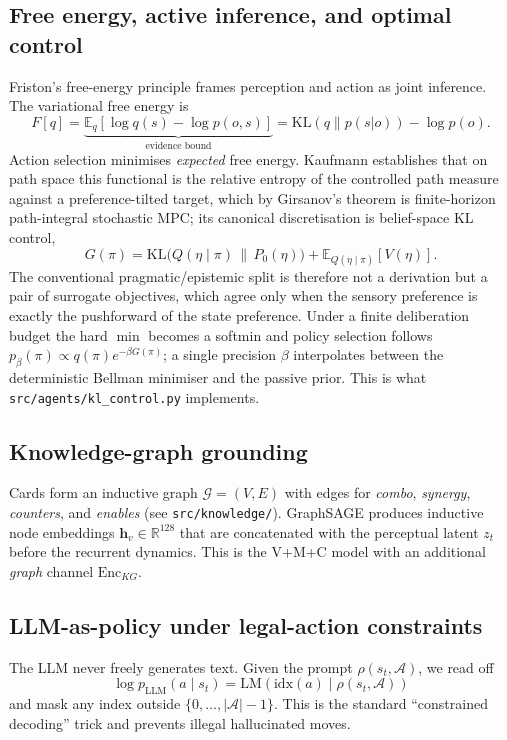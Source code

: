 \documentclass[11pt,a4paper]{article}
\begin{document}
\subsection{Free energy, active inference, and optimal control}
Friston's free-energy principle frames perception and action as joint
inference.  The variational free energy is
%
\begin{equation}
F[q] = \underbrace{\mathbb{E}_q[\log q(s) - \log p(o,s)]}_{\text{evidence bound}}
     = \mathrm{KL}(q\|p(s|o)) - \log p(o).
\end{equation}
%
Action selection minimises \emph{expected} free energy. Kaufmann
\cite{kaufmann2026aifcontrol} establishes that on path space this
functional is the relative entropy of the controlled path measure against
a preference-tilted target, which by Girsanov's theorem is finite-horizon
path-integral stochastic MPC; its canonical discretisation is
belief-space KL control,
%
\begin{equation}
G(\pi) = \mathrm{KL}\!\big(Q(\eta\mid\pi)\,\|\,P_0(\eta)\big)
       + \mathbb{E}_{Q(\eta\mid\pi)}[V(\eta)].
\end{equation}
%
The conventional pragmatic/epistemic split is therefore not a derivation
but a pair of surrogate objectives, which agree only when the sensory
preference is exactly the pushforward of the state preference.  Under a
finite deliberation budget the hard $\min$ becomes a softmin and policy
selection follows $p_\beta(\pi) \propto q(\pi)e^{-\beta G(\pi)}$; a single
precision $\beta$ interpolates between the deterministic Bellman minimiser
and the passive prior.  This is what
\texttt{src/agents/kl\_control.py} implements.

\subsection{Knowledge-graph grounding}
Cards form an inductive graph $\mathcal{G}=(V,E)$ with edges for
\emph{combo}, \emph{synergy}, \emph{counters}, and \emph{enables}
(see \texttt{src/knowledge/}).  GraphSAGE produces inductive node
embeddings $\mathbf{h}_v \in \mathbb{R}^{128}$ that are concatenated
with the perceptual latent $z_t$ before the recurrent dynamics.  This
is the V+M+C model with an additional \emph{graph} channel
$\mathrm{Enc}_{KG}$.

\subsection{LLM-as-policy under legal-action constraints}
The LLM never freely generates text.  Given the prompt
$\rho(s_t,\mathcal{A})$, we read off
%
\begin{equation}
\log p_{\text{LLM}}(a\mid s_t) =
  \mathrm{LM}(\text{idx}(a) \mid \rho(s_t,\mathcal{A}))
\end{equation}
%
and mask any index outside $\{0, \dots, |\mathcal{A}|-1\}$.  This is the
standard ``constrained decoding'' trick and prevents illegal
hallucinated moves.
\end{document}
